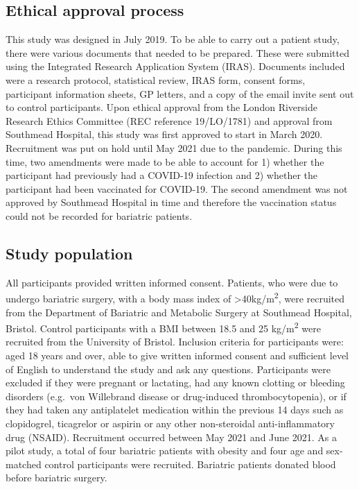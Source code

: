 \documentclass[11pt,twoside]{bristolthesis}
\begin{document}
\hypertarget{ethical-approval-process}{%
\subsection{Ethical approval process}\label{ethical-approval-process}}

This study was designed in July 2019. To be able to carry out a patient study, there were various documents that needed to be prepared. These were submitted using the Integrated Research Application System (IRAS). Documents included were a research protocol, statistical review, IRAS form, consent forms, participant information sheets, GP letters, and a copy of the email invite sent out to control participants. Upon ethical approval from the London Riverside Research Ethics Committee (REC reference 19/LO/1781) and approval from Southmead Hospital, this study was first approved to start in March 2020. Recruitment was put on hold until May 2021 due to the pandemic. During this time, two amendments were made to be able to account for 1) whether the participant had previously had a COVID-19 infection and 2) whether the participant had been vaccinated for COVID-19. The second amendment was not approved by Southmead Hospital in time and therefore the vaccination status could not be recorded for bariatric patients.

\hypertarget{study-population-1}{%
\subsection{Study population}\label{study-population-1}}

All participants provided written informed consent. Patients, who were due to undergo bariatric surgery, with a body mass index of \textgreater40kg/m\textsuperscript{2}, were recruited from the Department of Bariatric and Metabolic Surgery at Southmead Hospital, Bristol. Control participants with a BMI between 18.5 and 25 kg/m\textsuperscript{2} were recruited from the University of Bristol. Inclusion criteria for participants were: aged 18 years and over, able to give written informed consent and sufficient level of English to understand the study and ask any questions. Participants were excluded if they were pregnant or lactating, had any known clotting or bleeding disorders (e.g.~von Willebrand disease or drug-induced thrombocytopenia), or if they had taken any antiplatelet medication within the previous 14 days such as clopidogrel, ticagrelor or aspirin or any other non-steroidal anti-inflammatory drug (NSAID). Recruitment occurred between May 2021 and June 2021. As a pilot study, a total of four bariatric patients with obesity and four age and sex-matched control participants were recruited. Bariatric patients donated blood before bariatric surgery.
\end{document}
